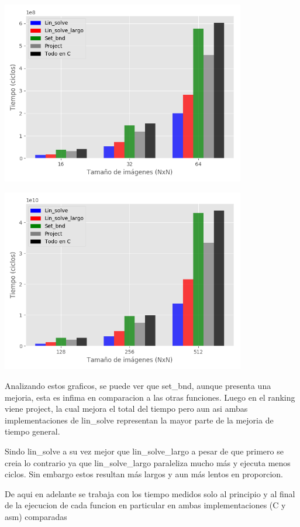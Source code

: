 \begin{center}
\includegraphics[width=0.8\textwidth]{imagenes/funciones16-64.png}
\end{center}

\begin{center}
\includegraphics[width=0.8\textwidth]{imagenes/funciones128-512.png}
\end{center}

Analizando estos graficos, se puede ver que set_bnd, aunque presenta una mejoria, esta es infima
en comparacion a las otras funciones. Luego en el ranking viene project, la cual mejora el total del tiempo
pero aun asi ambas implementaciones de lin_solve representan la mayor parte de la mejoria de tiempo general.

Sindo lin_solve a su vez mejor que lin_solve_largo a pesar de que primero se creia lo contrario ya que
lin_solve_largo paraleliza mucho más y ejecuta menos ciclos. Sin embargo estos resultan más largos y aun más lentos en proporcion.

De aqui en adelante se trabaja con los tiempo medidos solo al principio y al final de la ejecucion de cada
funcion en particular en ambas implementaciones (C y asm) comparadas

